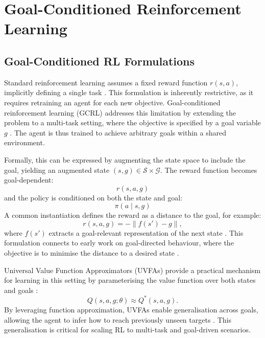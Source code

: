 \section{Goal-Conditioned Reinforcement Learning}

\subsection{Goal-Conditioned RL Formulations}

Standard reinforcement learning assumes a fixed reward function $r(s,a)$, implicitly defining a single task \cite{sutton2018reinforcement}. This formulation is inherently restrictive, as it requires retraining an agent for each new objective. Goal-conditioned reinforcement learning (GCRL) addresses this limitation by extending the problem to a multi-task setting, where the objective is specified by a goal variable $g$ \cite{Kaelbling1993LearningTA, pmlr-v37-schaul15, plappert2018multigoalreinforcementlearningchallenging}. The agent is thus trained to achieve arbitrary goals within a shared environment.

Formally, this can be expressed by augmenting the state space to include the goal, yielding an augmented state $(s, g) \in \mathcal{S} \times \mathcal{G}$. The reward function becomes goal-dependent:
\begin{equation}
    r(s, a, g)
\end{equation}
and the policy is conditioned on both the state and goal:
\begin{equation}
    \pi(a \mid s, g)
\end{equation}
A common instantiation defines the reward as a distance to the goal, for example:
\begin{equation}
    r(s, a, g) = -\| f(s') - g \|,
\end{equation}
where $f(s')$ extracts a goal-relevant representation of the next state \cite{nair2018visualreinforcementlearningimagined, pong2020skewfitstatecoveringselfsupervisedreinforcement}. This formulation connects to early work on goal-directed behaviour, where the objective is to minimise the distance to a desired state \cite{Kaelbling1993LearningTA}.

Universal Value Function Approximators (UVFAs) provide a practical mechanism for learning in this setting by parameterising the value function over both states and goals \cite{pmlr-v37-schaul15}:
\begin{equation}
    Q(s, a, g; \theta) \approx Q^*(s, a, g).
\end{equation}
By leveraging function approximation, UVFAs enable generalisation across goals, allowing the agent to infer how to reach previously unseen targets \cite{pmlr-v37-schaul15}. This generalisation is critical for scaling RL to multi-task and goal-driven scenarios.


